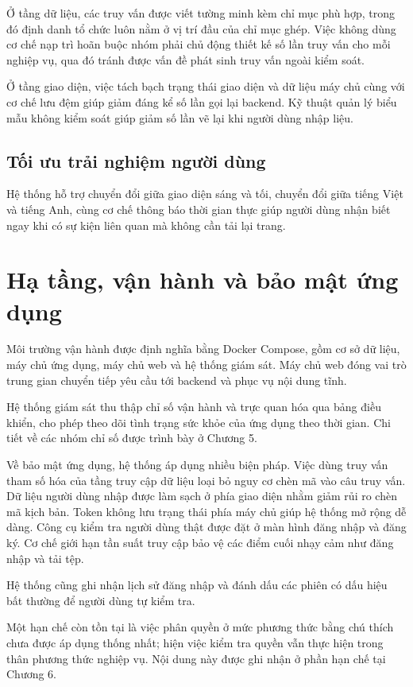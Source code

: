 \documentclass[12pt,a4paper,oneside]{report}
\begin{document}
Ở tầng dữ liệu, các truy vấn được viết tường minh kèm chỉ mục phù hợp, trong đó định danh tổ chức luôn nằm ở vị trí đầu của chỉ mục ghép. Việc không dùng cơ chế nạp trì hoãn buộc nhóm phải chủ động thiết kế số lần truy vấn cho mỗi nghiệp vụ, qua đó tránh được vấn đề phát sinh truy vấn ngoài kiểm soát.

Ở tầng giao diện, việc tách bạch trạng thái giao diện và dữ liệu máy chủ cùng với cơ chế lưu đệm giúp giảm đáng kể số lần gọi lại backend. Kỹ thuật quản lý biểu mẫu không kiểm soát giúp giảm số lần vẽ lại khi người dùng nhập liệu.

\subsection{Tối ưu trải nghiệm người dùng}

Hệ thống hỗ trợ chuyển đổi giữa giao diện sáng và tối, chuyển đổi giữa tiếng Việt và tiếng Anh, cùng cơ chế thông báo thời gian thực giúp người dùng nhận biết ngay khi có sự kiện liên quan mà không cần tải lại trang.

\section{Hạ tầng, vận hành và bảo mật ứng dụng}

Môi trường vận hành được định nghĩa bằng Docker Compose, gồm cơ sở dữ liệu, máy chủ ứng dụng, máy chủ web và hệ thống giám sát. Máy chủ web đóng vai trò trung gian chuyển tiếp yêu cầu tới backend và phục vụ nội dung tĩnh.

Hệ thống giám sát thu thập chỉ số vận hành và trực quan hóa qua bảng điều khiển, cho phép theo dõi tình trạng sức khỏe của ứng dụng theo thời gian. Chi tiết về các nhóm chỉ số được trình bày ở Chương 5.

Về bảo mật ứng dụng, hệ thống áp dụng nhiều biện pháp. Việc dùng truy vấn tham số hóa của tầng truy cập dữ liệu loại bỏ nguy cơ chèn mã vào câu truy vấn. Dữ liệu người dùng nhập được làm sạch ở phía giao diện nhằm giảm rủi ro chèn mã kịch bản. Token không lưu trạng thái phía máy chủ giúp hệ thống mở rộng dễ dàng. Công cụ kiểm tra người dùng thật được đặt ở màn hình đăng nhập và đăng ký. Cơ chế giới hạn tần suất truy cập bảo vệ các điểm cuối nhạy cảm như đăng nhập và tải tệp.

Hệ thống cũng ghi nhận lịch sử đăng nhập và đánh dấu các phiên có dấu hiệu bất thường để người dùng tự kiểm tra.

Một hạn chế còn tồn tại là việc phân quyền ở mức phương thức bằng chú thích chưa được áp dụng thống nhất; hiện việc kiểm tra quyền vẫn thực hiện trong thân phương thức nghiệp vụ. Nội dung này được ghi nhận ở phần hạn chế tại Chương 6.
\end{document}
